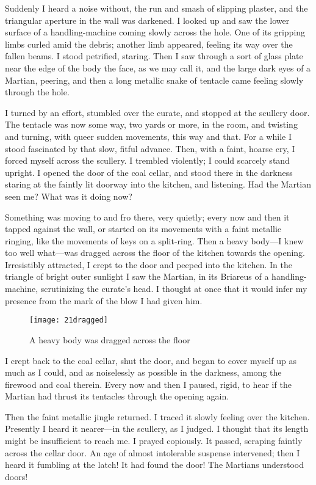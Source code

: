 Suddenly I heard a noise without, the run and smash of slipping plaster, and the triangular aperture in the wall was darkened. I looked up and saw the lower surface of a handling-machine coming slowly across the hole. One of its gripping limbs curled amid the debris; another limb appeared, feeling its way over the fallen beams. I stood petrified, staring. Then I saw through a sort of glass plate near the edge of the body the face, as we may call it, and the large dark eyes of a Martian, peering, and then a long metallic snake of tentacle came feeling slowly through the hole.

I turned by an effort, stumbled over the curate, and stopped at the scullery door. The tentacle was now some way, two yards or more, in the room, and twisting and turning, with queer sudden movements, this way and that. For a while I stood fascinated by that slow, fitful advance. Then, with a faint, hoarse cry, I forced myself across the scullery. I trembled violently; I could scarcely stand upright. I opened the door of the coal cellar, and stood there in the darkness staring at the faintly lit doorway into the kitchen, and listening. Had the Martian seen me? What was it doing now?

Something was moving to and fro there, very quietly; every now and then it tapped against the wall, or started on its movements with a faint metallic ringing, like the movements of keys on a split-ring. Then a heavy body—I knew too well what—was dragged across the floor of the kitchen towards the opening. Irresistibly attracted, I crept to the door and peeped into the kitchen. In the triangle of bright outer sunlight I saw the Martian, in its Briareus of a handling-machine, scrutinizing the curate's head. I thought at once that it would infer my presence from the mark of the blow I had given him.

\begin{figure}[tbp]
\centering
\texttt{[image: 21dragged]}
\caption{A heavy body was dragged across the floor}
\end{figure}

I crept back to the coal cellar, shut the door, and began to cover myself up as much as I could, and as noiselessly as possible in the darkness, among the firewood and coal therein. Every now and then I paused, rigid, to hear if the Martian had thrust its tentacles through the opening again.

Then the faint metallic jingle returned. I traced it slowly feeling over the kitchen. Presently I heard it nearer—in the scullery, as I judged. I thought that its length might be insufficient to reach me. I prayed copiously. It passed, scraping faintly across the cellar door. An age of almost intolerable suspense intervened; then I heard it fumbling at the latch! It had found the door! The Martians understood doors!

